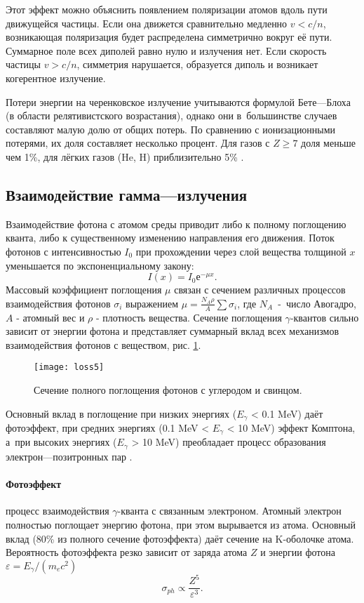 Этот эффект можно объяснить появлением поляризации атомов вдоль пути
движущейся частицы. Если она движется сравнительно медленно $v < c/n$,
возникающая поляризация будет распределена симметрично вокруг её пути.
Суммарное поле всех диполей равно нулю и излучения нет. Если скорость
частицы $v > c/n$, симметрия нарушается, образуется диполь и возникает
когерентное излучение.

Потери энергии на черенковское излучение учитываются формулой
Бете---Блоха (в области релятивистского возрастания), однако они
в~большинстве случаев составляют малую долю от общих потерь.
По сравнению с ионизационными потерями, их доля составляет несколько
процент. Для газов с $Z\geq7$ доля меньше чем 1\%, для лёгких газов
(He, H) приблизительно 5\% \cite{den:04}.

\subsection{Взаимодействие гамма---излучения}
Взаимодействие фотона с атомом среды приводит либо к полному поглощению
кванта, либо к существенному изменению направления его движения. Поток
фотонов с интенсивностью $I_0$ при прохождении через слой вещества
толщиной $x$ уменьшается по экспоненциальному закону:
\[
I(x)=I_{0}е^{-\mu x}.
\]
Массовый коэффициент поглощения $\mu$ связан с сечением различных
процессов взаимодействия фотонов $\sigma_i$ выражением
$\mu=\frac{N_A\rho}{A}\sum\sigma_i$, где $N_A$~-~число Авогадро,
$A$ - атомный вес и $\rho$ - плотность вещества. Сечение поглощения
$\gamma$-квантов сильно зависит от энергии фотона и представляет суммарный
вклад всех механизмов взаимодействия фотонов с веществом,
рис. \ref{fig:loss5}.
\begin{figure}[h]\center
  \texttt{[image: loss5]}
  \caption{Сечение полного поглощения фотонов с углеродом и свинцом.}
  \label{fig:loss5}
\end{figure}

Основный вклад в поглощение при низких энергиях ($E_\gamma$ < 0.1 MeV)
даёт фотоэффект, при средних энергиях (0.1 MeV < $E_\gamma$ < 10 MeV)
эффект Комптона, а~при высоких энергиях ($E_\gamma$ > 10 MeV)
преобладает процесс образования электрон---позитронных пар \cite{mas:06}.
\paragraph{Фотоэффект} процесс взаимодействия $\gamma$-кванта с связанным
электроном. Атомный электрон полностью поглощает энергию фотона, при
этом вырывается из атома. Основный вклад (80\% из полного сечение
фотоэффекта) даёт сечение на K-оболочке атома. Вероятность фотоэффекта
резко зависит от заряда атома $Z$ и энергии фотона
$\varepsilon=E_\gamma/(m_ec^2)$
\[
\sigma_{ph}\propto\frac{Z^5}{\varepsilon^3}.
\]
